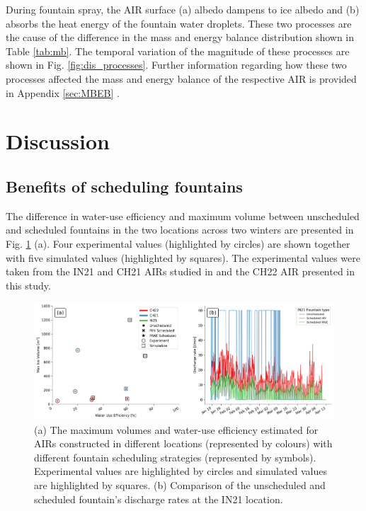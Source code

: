 \documentclass[tc, manuscript]{copernicus}
\begin{document}
During fountain spray, the AIR surface (a) albedo dampens to ice albedo and (b) absorbs the heat energy of the
fountain water droplets. These two processes are the cause of the difference in the mass and energy balance
distribution shown in Table \ref{tab:mb}. The temporal variation of the magnitude of these processes are shown
in Fig. \ref{fig:dis_processes}. Further information regarding how these two processes affected the mass and
energy balance of the respective AIR is provided in Appendix \ref{sec:MBEB} . 



\section{Discussion}


\subsection{Benefits of scheduling fountains}

The difference in water-use efficiency and maximum volume between unscheduled and scheduled fountains in the two
locations across two winters are presented in Fig. \ref{fig:wue} (a). Four experimental values (highlighted by
circles) are shown together with five simulated values (highlighted by squares).  The experimental values were
taken from the IN21 and CH21 AIRs studied in \citet{balasubramanianInfluenceMeteorologicalConditions2022} and
the CH22 AIR presented in this study. 

\begin{figure}[t]
\includegraphics[width=\textwidth]{Figures/wue.png}

\caption{(a) The maximum volumes and water-use efficiency estimated for AIRs constructed in different locations
(represented by colours) with different fountain scheduling strategies (represented by symbols). Experimental
values are highlighted by circles and simulated values are highlighted by squares. (b) Comparison of
the unscheduled and scheduled fountain's discharge rates at the IN21 location.}

\label{fig:wue}
\end{figure}
\end{document}
